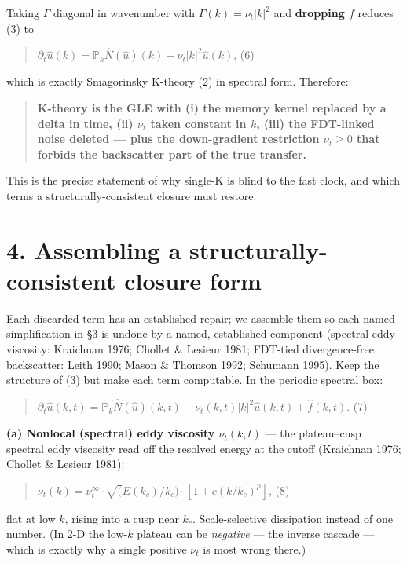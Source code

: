 \documentclass[aps,prfluids,preprint,superscriptaddress,nofootinbib]{revtex4-2}
\begin{document}
Taking $\Gamma $ diagonal in wavenumber with $\Gamma (k)=\nu _{t}|k|^{2}$ and \textbf{dropping $f$} reduces (3) to

\begin{quote}
$\partial _{t}\hat{u}(k) = \mathbb{P}_{k} \hat{N}(\hat{u})(k) - \nu _{t}|k|^{2} \hat{u}(k)$, (6)
\end{quote}

which is exactly Smagorinsky K-theory (2) in spectral form. Therefore:

\begin{quote}
\textbf{K-theory is the GLE with (i) the memory kernel replaced by a delta in time, (ii) $\nu _{t}$ taken constant in $k$, (iii) the FDT-linked noise deleted — plus the down-gradient restriction $\nu _{t}\ge 0$ that forbids the backscatter part of the true transfer.}
\end{quote}

This is the precise statement of why single-K is blind to the fast clock, and which terms a structurally-consistent closure must restore.

\section*{4. Assembling a structurally-consistent closure form}

Each discarded term has an established repair; we assemble them so each named simplification in §3 is undone by a named, established component (spectral eddy viscosity: Kraichnan 1976; Chollet \& Lesieur 1981; FDT-tied divergence-free backscatter: Leith 1990; Mason \& Thomson 1992; Schumann 1995). Keep the structure of (3) but make each term computable. In the periodic spectral box:

\begin{quote}
$\partial _{t}\hat{u}(k,t) = \mathbb{P}_{k} \hat{N}(\hat{u})(k,t) - \nu _{t}(k,t)|k|^{2} \hat{u}(k,t) + \hat{f}(k,t)$. (7)
\end{quote}

\textbf{(a) Nonlocal (spectral) eddy viscosity $\nu _{t}(k,t)$} — the plateau–cusp spectral eddy viscosity read off the resolved energy at the cutoff (Kraichnan 1976; Chollet \& Lesieur 1981):

\begin{quote}
$\nu _{t}(k) = \nu _{t}^\infty  \cdot  \surd (E(k_{c})/k_{c}) \cdot  [1 + c(k/k_{c})^{p}]$, (8)
\end{quote}

flat at low $k$, rising into a cusp near $k_{c}$. Scale-selective dissipation instead of one number. (In 2-D the low-$k$ plateau can be \emph{negative} — the inverse cascade — which is exactly why a single positive $\nu _{t}$ is most wrong there.)
\end{document}
